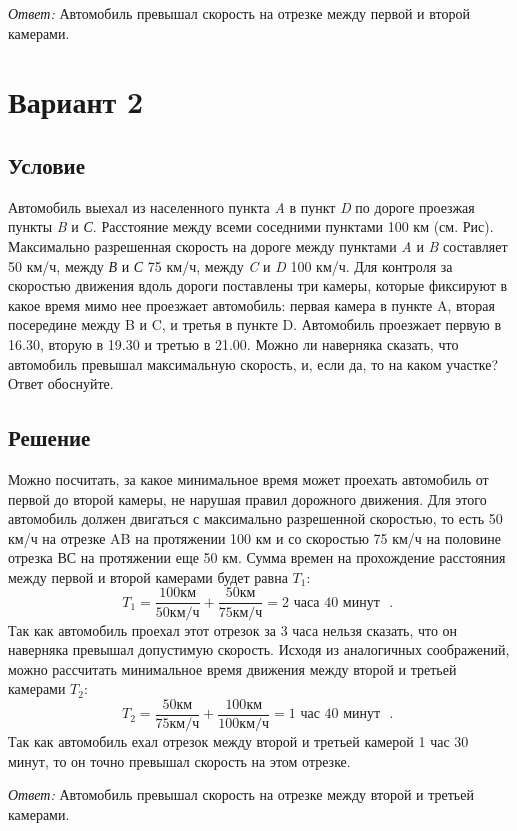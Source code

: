 \textit{Ответ:} Автомобиль превышал скорость на отрезке между первой и второй камерами.


\section*{Вариант 2}

\subsection*{Условие}

     Автомобиль выехал из населенного пункта \textit{A} в пункт \textit{D} по дороге проезжая пункты \textit{B} и \textit{С}. Расстояние между всеми соседними пунктами 100 км (см. Рис). Максимально разрешенная скорость на дороге между пунктами \textit{A} и \textit{B} составляет 50 км/ч, между \textit{В} и \textit{С} 75 км/ч, между \textit{C} и \textit{D} 100 км/ч. Для контроля за скоростью движения вдоль дороги поставлены три камеры, которые фиксируют в какое время мимо нее проезжает автомобиль: первая камера в пункте A, вторая посередине между B и C, и третья в пункте D. Автомобиль проезжает первую в 16.30, вторую в 19.30 и третью в 21.00. Можно ли наверняка сказать, что автомобиль превышал максимальную скорость, и, если да, то на каком участке? Ответ обоснуйте.
     
     
\subsection*{Решение}
Можно посчитать, за какое минимальное время может проехать автомобиль от первой до второй камеры, не нарушая правил дорожного движения. Для этого автомобиль должен двигаться с максимально разрешенной скоростью, то есть 50 км/ч на отрезке AB на протяжении 100 км и со скоростью 75 км/ч на половине отрезка ВС на протяжении еще 50 км. Сумма времен на прохождение расстояния между первой и второй камерами будет равна $T_1$:
     \begin{equation}
     T_1 = \frac{100 \mbox{км}}{50 \mbox{км/ч}} + \frac{50 \mbox{км}}{75 \mbox{км/ч}} = 2 \mbox{ часа } 40 \mbox{ минут } \mbox{ . }
     \end{equation}
Так как автомобиль проехал этот отрезок за 3 часа нельзя сказать, что он наверняка превышал допустимую скорость. Исходя из аналогичных соображений, можно рассчитать минимальное время движения между второй и третьей камерами $T_2$:
     \begin{equation}
     T_2 = \frac{50 \mbox{км}}{75 \mbox{км/ч}} + \frac{100 \mbox{км}}{100 \mbox{км/ч}} = 1 \mbox{ час } 40 \mbox{ минут } \mbox{ . }
     \end{equation}
Так как автомобиль ехал отрезок между второй и третьей камерой 1 час 30 минут, то он точно превышал скорость на этом отрезке.

\textit{Ответ:} Автомобиль превышал скорость на отрезке между второй и третьей камерами.




